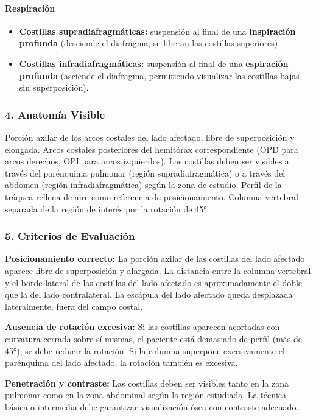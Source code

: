 	\paragraph{Respiración}
	\begin{itemize}
		\item \textbf{Costillas supradiafragmáticas:} suspensión al final de una \textbf{inspiración profunda} (desciende el diafragma, se liberan las costillas superiores).
		\item \textbf{Costillas infradiafragmáticas:} suspensión al final de una \textbf{espiración profunda} (asciende el diafragma, permitiendo visualizar las costillas bajas sin superposición).
	\end{itemize}
	
	\subsubsection*{4. Anatomía Visible}
	
	Porción axilar de los arcos costales del lado afectado, libre de superposición y elongada. Arcos costales posteriores del hemitórax correspondiente (OPD para arcos derechos, OPI para arcos izquierdos). Las costillas deben ser visibles a través del parénquima pulmonar (región supradiafragmática) o a través del abdomen (región infradiafragmática) según la zona de estudio. Perfil de la tráquea rellena de aire como referencia de posicionamiento. Columna vertebral separada de la región de interés por la rotación de 45°.
	
	\subsubsection*{5. Criterios de Evaluación}
	
	\textbf{Posicionamiento correcto:} La porción axilar de las costillas del lado afectado aparece libre de superposición y alargada. La distancia entre la columna vertebral y el borde lateral de las costillas del lado afectado es aproximadamente el doble que la del lado contralateral. La escápula del lado afectado queda desplazada lateralmente, fuera del campo costal.
	
	\textbf{Ausencia de rotación excesiva:} Si las costillas aparecen acortadas con curvatura cerrada sobre sí mismas, el paciente está demasiado de perfil (más de 45°); se debe reducir la rotación. Si la columna superpone excesivamente el parénquima del lado afectado, la rotación también es excesiva.
	
	\textbf{Penetración y contraste:} Las costillas deben ser visibles tanto en la zona pulmonar como en la zona abdominal según la región estudiada. La técnica básica o intermedia debe garantizar visualización ósea con contraste adecuado.
	
